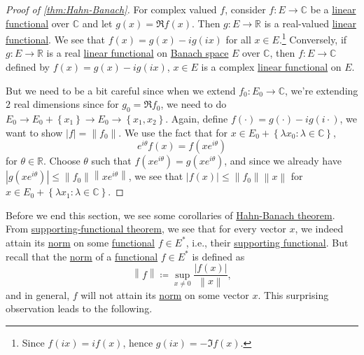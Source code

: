 \begin{proof}[Proof of \autoref{thm:Hahn-Banach}]
	For complex valued \(f\), consider \(f\colon E\to \mathbb{C} \) be a \hyperref[def:linear-functional]{linear functional} over \(\mathbb{C} \) and let \(g(x) = \Re f(x)\). Then \(g\colon E\to \mathbb{R} \) is a real-valued \hyperref[def:linear-functional]{linear functional}. We see that \(f(x) = g(x) - ig(ix)\) for all \(x\in E\).\footnote{Since \(f(ix) = if(x)\), hence \(g(ix) = -\Im f(x)\).} Conversely, if \(g\colon E\to \mathbb{R} \) is a real \hyperref[def:linear-functional]{linear functional} on \hyperref[def:Banach-space]{Banach space} \(E\) over \(\mathbb{C} \), then \(f\colon E\to \mathbb{C} \) defined by \(f(x) = g(x) - ig(ix)\), \(x\in E\) is a complex \hyperref[def:linear-functional]{linear functional} on \(E\).

	But we need to be a bit careful since when we extend \(f_0 \colon E_0 \to \mathbb{C} \), we're extending \(2\) real dimensions since for \(g_0 = \Re f_0\), we need to do \(E_0 \to E_0 + \left\{ x_1 \right\} \to E_0 \to \left\{ x_1, x_2 \right\} \). Again, define \(f(\cdot) = g(\cdot) - ig(i\cdot)\), we want to show \(\left\vert f \right\vert = \left\lVert f_0\right\rVert \). We use the fact that for \(x\in E_{0} + \left\{ \lambda x_0\colon \lambda \in \mathbb{C}  \right\}\),
	\[
		e^{i \theta }f(x) = f(x e^{i \theta })
	\]
	for \(\theta \in \mathbb{R} \). Choose \(\theta \) such that \(f(x e^{i \theta }) = g(x e^{i \theta })\), and since we already have \(\left\vert g(xe^{i \theta }) \right\vert \leq \left\lVert f_0\right\rVert \left\lVert x e^{i \theta }\right\rVert \), we see that \(\left\vert f(x) \right\vert \leq \left\lVert f_0\right\rVert \left\lVert x\right\rVert \) for \(x\in E_0 + \left\{ \lambda x_1 \colon \lambda \in \mathbb{C}  \right\} \).
\end{proof}

Before we end this section, we see some corollaries of \hyperref[thm:Hahn-Banach]{Hahn-Banach theorem}. From \hyperref[thm:supporting-functional]{supporting-functional theorem}, we see that for every vector \(x\), we indeed attain its \hyperref[def:norm]{norm} on some \hyperref[def:linear-functional]{functional} \(f\in E^{\ast} \), i.e., their \hyperref[thm:supporting-functional]{supporting functional}. But recall that the \hyperref[def:norm]{norm} of a \hyperref[def:linear-functional]{functional} \(f\in E^{\ast} \) is defined as
\[
	\left\lVert f\right\rVert \coloneqq \sup _{x \neq 0}\frac{\left\vert f(x) \right\vert }{\left\lVert x\right\rVert },
\]
and in general, \(f\) will not attain its \hyperref[def:norm]{norm} on some vector \(x\). This surprising observation leads to the following.

